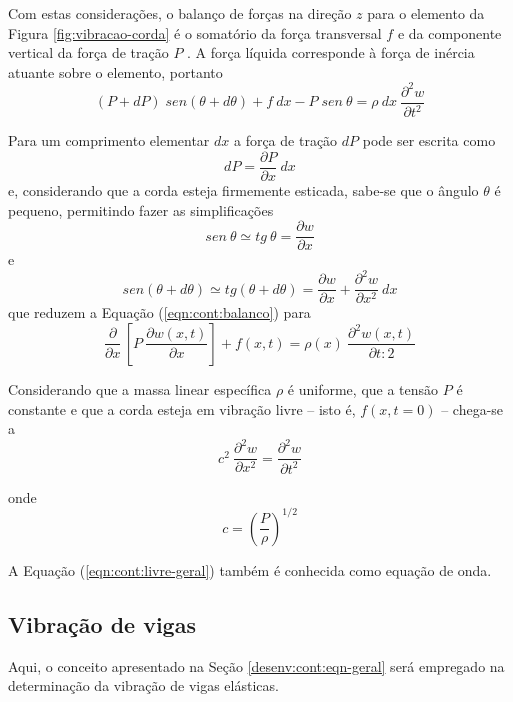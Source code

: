 \documentclass[12pt,openright,oneside,a4paper,
	chapter=TITLE,section=TITLE,
	english,brazil]{abntex2}
\begin{document}
	Com estas considerações, o balanço de forças na direção $z$ para o elemento da Figura \ref{fig:vibracao-corda} é o somatório da força transversal $f$ e da componente vertical da força de tração $P$ \cite{rao:2008}. A força líquida corresponde à força de inércia atuante sobre o elemento, portanto
	\begin{equation} \label{eqn:cont:balanco}
		(P + dP)\;sen(\theta + d\theta) + f\:dx - P\;sen\:\theta = \rho\:dx\:\frac{\partial^2 w}{\partial t^2}
	\end{equation}
	
	Para um comprimento elementar $dx$ a força de tração $dP$ pode ser escrita como \[dP = \frac{\partial P}{\partial x}\:dx\] e, considerando que a corda esteja firmemente esticada, sabe-se que o ângulo $\theta$ é pequeno, permitindo fazer as simplificações \[sen\:\theta \simeq tg\:\theta = \frac{\partial w}{\partial x} \] e \[sen(\theta + d\theta) \simeq tg(\theta + d\theta) = \frac{\partial w}{\partial x} + \frac{\partial^2 w}{\partial x^2}\:dx \] que reduzem a Equação (\ref{eqn:cont:balanco}) para \[\frac{\partial}{\partial x}\,\left[P\:\frac{\partial w(x,t)}{\partial x}\right] + f(x,t) = \rho(x)\:\frac{\partial^2 w(x,t)}{\partial t:2} \]
	
	Considerando que a massa linear específica $\rho$ é uniforme, que a tensão $P$ é constante e que a corda esteja em vibração livre -- isto é, $f(x,t = 0)$ -- chega-se a \cite{rao:2008}
	\begin{equation}\label{eqn:cont:livre-geral}
		c^2\:\frac{\partial^2 w}{\partial x^2}=\frac{\partial^2 w}{\partial t^2}
	\end{equation}
	
	onde
	\begin{equation}
		c = \left(\frac{P}{\rho}\right)^{1/2}
	\end{equation}
	
	A Equação (\ref{eqn:cont:livre-geral}) também é conhecida como equação de onda. 
	
	\subsection{Vibração de vigas}
	Aqui, o conceito apresentado na Seção \ref{desenv:cont:eqn-geral} será empregado na determinação da vibração de vigas elásticas. 

	\postextual
	
	
		
\end{document}
